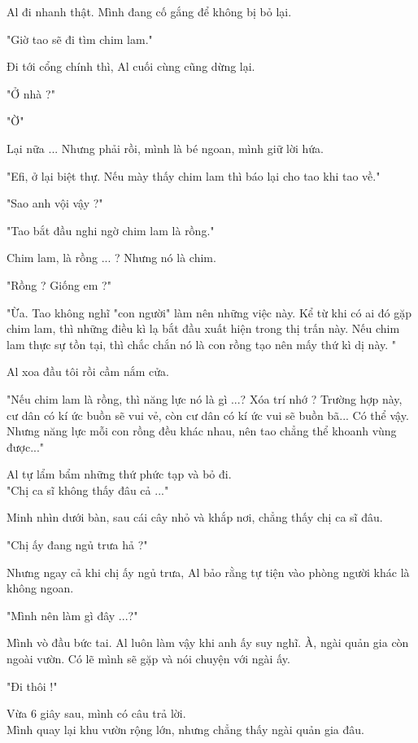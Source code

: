 Al đi nhanh thật. Mình đang cố gắng để không bị bỏ lại.

"Giờ tao sẽ đi tìm chim lam."

Đi tới cổng chính thì, Al cuối cùng cũng dừng lại.

"Ở nhà ?"

"Ờ"

Lại nữa ... Nhưng phải rồi, mình là bé ngoan, mình giữ lời hứa.

"Efi, ở lại biệt thự. Nếu mày thấy chim lam thì báo lại cho tao khi tao về."

"Sao anh vội vậy ?"

"Tao bắt đầu nghi ngờ chim lam là rồng."

Chim lam, là rồng ... ? Nhưng nó là chim.

"Rồng ? Giống em ?"

"Ừa. Tao không nghĩ "con người" làm nên những việc này. Kể từ khi có ai đó gặp chim lam, thì những điều kì lạ bắt đầu xuất hiện trong thị trấn này. Nếu chim lam thực sự tồn tại, thì chắc chắn nó là con rồng tạo nên mấy thứ kì dị này. "

Al xoa đầu tôi rồi cầm nắm cửa.

"Nếu chim lam là rồng, thì năng lực nó là gì ...? Xóa trí nhớ ? Trường hợp này, cư dân có kí ức buồn sẽ vui vẻ, còn cư dân có kí ức vui sẽ buồn bã... Có thể vậy. Nhưng năng lực mỗi con rồng đều khác nhau, nên tao chẳng thể khoanh vùng được..."

Al tự lẩm bẩm những thứ phức tạp và bỏ đi.\\


"Chị ca sĩ không thấy đâu cả ..."

Minh nhìn dưới bàn, sau cái cây nhỏ và khắp nơi, chẳng thấy chị ca sĩ đâu.

"Chị ấy đang ngủ trưa hả ?"

Nhưng ngay cả khi chị ấy ngủ trưa, Al bảo rằng tự tiện vào phòng người khác là không ngoan. 

"Mình nên làm gì đây ...?"

Mình vò đầu bức tai. Al luôn làm vậy khi anh ấy suy nghĩ. À, ngài quản gia còn ngoài vườn. Có lẽ mình sẽ gặp và nói chuyện với ngài ấy.

"Đi thôi !"

Vừa 6 giây sau, mình có câu trả lời. \\


Mình quay lại khu vườn rộng lớn, nhưng chẳng thấy ngài quản gia đâu.


